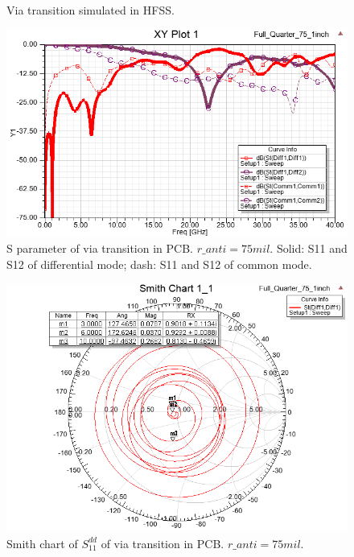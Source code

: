 \documentclass{book}  %
\begin{document}
\begin{paper}
\begin{figure}[h]
	\centering
	\label{fig:pcb_via_trans_HFSS}
	\caption{Via transition simulated in HFSS.}
\end{figure}


\begin{figure}[h]
	\centering
	\includegraphics[width=0.8\columnwidth]{./img/PCB/Via_Transition/S_parameter.png}
	\caption{S parameter of via transition in PCB. $r\_anti = 75 mil$. Solid: S11 and S12 of differential mode; dash: S11 and S12 of common mode.}
	\label{fig:pcb_via_tran_S} %
\end{figure}

\begin{figure}[htbp!]
	\centering
	\includegraphics[width=0.8\columnwidth]{./img/PCB/Via_Transition/via_transition_smith.png}
	\caption{Smith chart of $S^{dd}_{11}$ of via transition in PCB. $r\_anti = 75 mil$. }
	\label{fig:pcb_via_tran_Sdd11_smith} %
\end{figure}


\end{paper}
\end{document}
